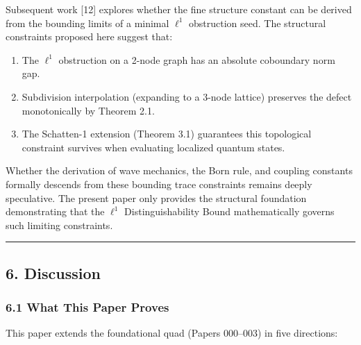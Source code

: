 \documentclass[
]{article}
\providecommand{\tightlist}{%
  \setlength{\itemsep}{0pt}\setlength{\parskip}{0pt}}
\begin{document}
Subsequent work {[}12{]} explores whether the fine structure constant
can be derived from the bounding limits of a minimal \(\ell^1\)
obstruction seed. The structural constraints proposed here suggest that:

\begin{enumerate}
\def\labelenumi{\arabic{enumi}.}
\tightlist
\item
  The \(\ell^1\) obstruction on a 2-node graph has an absolute
  coboundary norm gap.
\item
  Subdivision interpolation (expanding to a 3-node lattice) preserves
  the defect monotonically by Theorem 2.1.
\item
  The Schatten-1 extension (Theorem 3.1) guarantees this topological
  constraint survives when evaluating localized quantum states.
\end{enumerate}

Whether the derivation of wave mechanics, the Born rule, and coupling
constants formally descends from these bounding trace constraints
remains deeply speculative. The present paper only provides the
structural foundation demonstrating that the \(\ell^1\)
Distinguishability Bound mathematically governs such limiting
constraints.

\begin{center}\rule{0.5\linewidth}{0.5pt}\end{center}

\subsection{6. Discussion}\label{discussion}

\subsubsection{6.1 What This Paper Proves}\label{what-this-paper-proves}

This paper extends the foundational quad (Papers 000--003) in five
directions:
\end{document}
